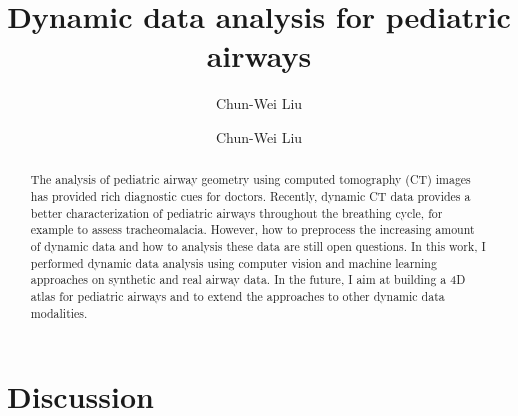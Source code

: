 \documentclass{llncs}
\begin{document}
%
\frontmatter          %
%
\pagestyle{empty}  %
%
\mainmatter              %
%
\title{Dynamic data analysis for pediatric airways}
%
%
\author{Chun-Wei Liu}
%
%
%

\author{Chun-Wei Liu}

\maketitle              %

\begin{abstract}
The analysis of pediatric airway geometry using computed tomography (CT) images has provided rich diagnostic cues for doctors. Recently, dynamic CT data provides a better characterization of pediatric airways throughout the breathing cycle, for example to assess tracheomalacia. However, how to preprocess the increasing amount of dynamic data and how to analysis these data are still open questions. In this work, I performed dynamic data analysis using computer vision and machine learning approaches on synthetic and real airway data. In the future, I aim at building a 4D atlas for pediatric airways and to extend the approaches to other dynamic data modalities.
\end{abstract}






\section{Discussion}
\label{sec:discussion}



\end{document}
